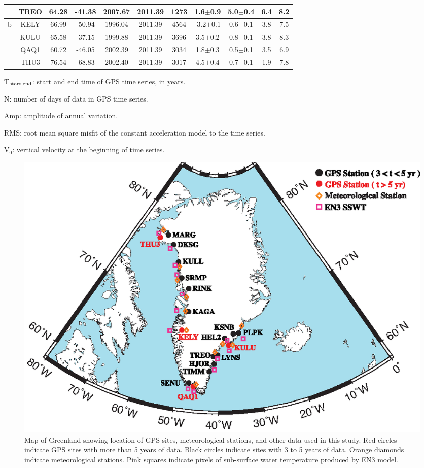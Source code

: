 \begin{table}[h!]
\begin{adjustbox}{width=1\textwidth}
\begin{threeparttable}
\begin{tabular}{ccccccccccc}
&TREO&64.28&-41.38&2007.67&2011.39&1273&1.6$\pm$0.9&5.0$\pm$0.4&6.4&8.2\\
\midrule
b&KELY&66.99&-50.94&1996.04&2011.39&4564&-3.2$\pm$0.1&0.6$\pm$0.1&3.8&7.5\\
&KULU&65.58&-37.15&1999.88&2011.39&3696&3.5$\pm$0.2&0.8$\pm$0.1&3.8&8.3\\
&QAQ1&60.72&-46.05&2002.39&2011.39&3034&1.8$\pm$0.3&0.5$\pm$0.1&3.5&6.9\\
&THU3&76.54&-68.83&2002.40&2011.39&3017&4.5$\pm$0.4&0.7$\pm$0.1&1.9&7.8\\
\midrule
\end{tabular}
\begin{tablenotes}
\small
\item T$_{\textup{start,end}}$: start and end time of GPS time series, in years.
\item N: number of days of data in GPS time series.
\item Amp: amplitude of annual variation.
\item RMS: root mean square misfit of the constant acceleration model to the time series.
\item V$_{0}$: vertical velocity at the beginning of time series. 
\end{tablenotes}
\end{threeparttable}
\end{adjustbox}
\label{tab:chpt3_table3}
\end{table}

\clearpage
\begin{figure}
 \centering
 \includegraphics{figs_chpt3/2012GC004432-p01.eps} 
 \caption[Map of Greenland showing location of GPS sites, meteorological stations, and other data used in this study.]{Map of Greenland showing location of GPS sites, meteorological stations, and other data used in this study. Red circles indicate GPS sites with more than 5 years of data. Black circles indicate sites with 3 to 5 years of data. Orange diamonds indicate meteorological stations. Pink squares indicate pixels of sub-surface water temperature produced by EN3 model.}
 \label{fig:fig1}
\end{figure}

